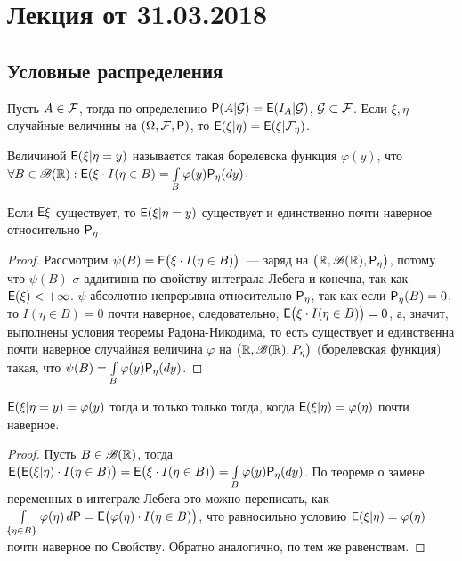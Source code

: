 \section{Лекция от 31.03.2018}
 \subsection{Условные распределения}
 \begin{definition}
 	Пусть $A \in \F$, тогда по определению $\P(A | \G) = \E( I_A | \G)$, $\G \subset \F$. Если $\xi, \eta$~--- случайные величины на $(\Omega, \F, \P)$, то $\E(\xi | \eta) = \E(\xi | \F_\eta)$.
 \end{definition}
 \begin{definition}
 	Величиной $\E (\xi | \eta = y)$ называется такая борелевска функция $\varphi(y)$, 
 	что $\forall B \in \B(\R): \E(\xi \cdot I(\eta \in B) = 
 	\int\limits_B \varphi(y) \P_\eta (d y)$.
 \end{definition}
 \begin{lemma}
 	Если $\E \xi$ существует, то $\E( \xi | \eta = y)$ существует и единственно почти 
 	наверное относительно $\P_\eta$.
 	\begin{proof}
 		Рассмотрим $\psi(B) = \E \big( \xi \cdot I (\eta \in B) \big)$~--- заряд на 
 		$\big( \R, \B(\R), \P_\eta \big)$, потому что $\psi(B)$ $\sigma$-аддитивна по
 		 свойству интеграла Лебега и конечна, так как $\E(\xi) < +\infty$. 
 		 $\psi$ абсолютно непрерывна относительно $\P_\eta$, так как если 
 		 $\P_\eta(B) = 0$, то $I(\eta \in B) = 0$ почти наверное, следовательно, 
 		 $\E \big( \xi \cdot I (\eta \in B) \big) = 0$, а, значит, выполнены условия 
 		 теоремы Радона-Никодима, то есть существует и единственна почти наверное 
 		 случайная величина $\varphi$ на $\big( \R, \B(\R), P_\eta \big)$ 
 		 (борелевская функция) такая, что 
 		 $\psi(B) = \int\limits_B \varphi(y) \P_\eta(dy)$.
 	\end{proof}
 \end{lemma}
 \begin{lemma}
 	$\E ( \xi | \eta = y) = \varphi(y)$ тогда и только только тогда, когда 
 	$\E(\xi | \eta) = \varphi(\eta)$ почти наверное.
 	\begin{proof}
 		Пусть $B \in \B(\R)$, тогда 
 		$\E \big( \E(\xi | \eta) \cdot I (\eta \in B) \big) = 
 		\E \big( \xi \cdot I(\eta \in B) \big) = \int\limits_B \varphi(y) \P_\eta(d y)$. 
 		По теореме о замене переменных в интеграле Лебега это можно переписать, как 
 		$\int\limits_{\{\eta \in B \}} \varphi(\eta) \, d \P = 
 		\E \big( \varphi(\eta) \cdot I (\eta \in B) \big)$, 
 		что равносильно условию $\E(\xi | \eta) = \varphi(\eta)$ 
 		почти наверное по Свойству. Обратно аналогично, по тем же равенствам.
 	\end{proof}
 \end{lemma}
